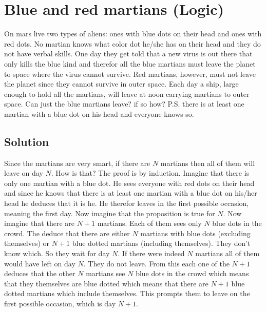 \section{Blue and red martians (Logic)}
On mars live two types of aliens: ones with blue dots on their head and ones with red dots. No martian knows what color dot he/she has on their head and they do not have verbal skills. One day they get told that a new virus is out there that only kills the blue kind and therefor all the blue martians must leave the planet to space where the virus cannot survive. Red martians, however, must not leave the planet since they cannot survive in outer space. Each day a ship, large enough to hold all the martians, will leave at noon carrying martians to outer space. Can just the blue martians leave? if so how? P.S. there is at least one martian with a blue dot on his head and everyone knows so.

\subsection{Solution}
Since the martians are very smart, if there are $N$ martians then all of them will leave on day $N$. How is that? The proof is by induction. Imagine that there is only one martian with a blue dot. He sees everyone with red dots on their head and since he knows that there is at least one martian with a blue dot on his/her head he deduces that it is he. He therefor leaves in the first possible occasion, meaning the first day. Now imagine that the proposition is true for $N$. Now imagine that there are $N+1$ martians. Each of them sees only $N$ blue dots in the crowd. The deduce that there are either $N$ martians with blue dots (excluding themselves) or $N+1$ blue dotted martians (including themselves). They don't know which. So they wait for day $N$. If there were indeed $N$ martians all of them would have left on day $N$. They do not leave. From this each one of the $N+1$ deduces that the other $N$ martians see $N$ blue dots in the crowd which means that they themselves are blue dotted which means that there are $N+1$ blue dotted martians which include themselves. This prompts them to leave on the first possible occasion, which is day $N+1$.
